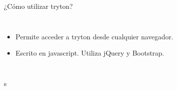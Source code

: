 \begin{frame}[fragile=singleslide]{¿Cómo utilizar tryton?}
\begin{columns}
            \fontsize{10}{8}\selectfont
            \begin{itemize}
                \item Permite acceder a tryton desde cualquier navegador.
                \item Escrito en javascript. Utiliza jQuery y Bootstrap.
            \end{itemize}
        \end{columns}s
	\end{frame}

%
%
